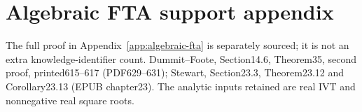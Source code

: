 \section{Algebraic FTA support appendix}
The full proof in Appendix~\ref{app:algebraic-fta} is separately sourced; it is not an extra knowledge-identifier count.
Dummit--Foote, Section14.6, Theorem35, second proof, printed615--617 (PDF629--631); Stewart, Section23.3, Theorem23.12 and Corollary23.13 (EPUB chapter23). The analytic inputs retained are real IVT and nonnegative real square roots.
